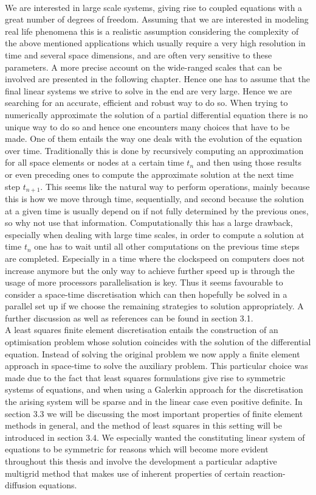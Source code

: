 \documentclass[../draft_1.tex]{subfiles}
\begin{document}
\smallskip
\\
We are interested in large scale systems, giving rise to coupled equations with a great number of degrees of freedom. Assuming that we are interested in modeling real life phenomena this is a realistic assumption considering the complexity of the above mentioned applications which usually require a very high resolution in time and several space dimensions, and are often very sensitive to these parameters. A more precise account on the wide-ranged scales that can be involved are presented in the following chapter. Hence one has to assume that the final linear systems we strive to solve in the end are very large. Hence we are searching for an accurate, efficient and robust way to do so. When trying to numerically approximate the solution of a partial differential equation there is no unique way to do so and hence one encounters many choices that have to be made. One of them entails the way one deals with the evolution of the equation over time. Traditionally this is done by recursively computing an approximation for all space elements or nodes at a certain time $t_n$ and then using those results or even preceding ones to compute the approximate solution at the next time step $t_{n+1}$. This seems like the natural way to perform operations, mainly because this is how we move through time, sequentially, and second because the solution at a given time is usually depend on if not fully determined by the previous ones, so why not use that information. Computationally this has a large drawback, especially when dealing with large time scales, in order to compute a solution at time $t_n$ one has to wait until all other computations on the previous time steps are completed. Especially in a time where the clockspeed on computers does not increase anymore but the only way to achieve further speed up is through the usage of more processors parallelisation is key. Thus it seems favourable to  consider a space-time discretisation which can then hopefully be solved in a parallel set up if we choose the remaining strategies to solution appropriately. A further discussion as well as references can be found in section 3.1. 
\smallskip
\\ 
A least squares finite element discretisation entails the construction of an optimisation problem whose solution coincides with the solution of the differential equation. Instead of solving the original problem we now apply a finite element approach in space-time to solve the auxiliary problem. This particular choice was made due to the fact that least squares formulations give rise to symmetric systems of equations, and when using a Galerkin approach for the discretisation the arising system will be sparse and in the linear case even positive definite. In section 3.3 we will be discussing the most important properties of finite element methods in general, and the method of least squares in this setting will be introduced in section 3.4. We especially wanted the constituting linear system of equations to be symmetric for reasons which will become more evident throughout this thesis and involve the development a particular adaptive multigrid method that makes use of inherent properties of certain reaction-diffusion equations.
\end{document}
